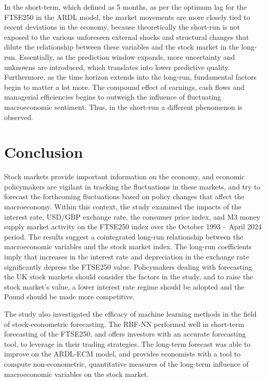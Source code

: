 \documentclass[11pt,a4paper]{article}
\begin{document}
In the short-term, which defined as 5 months, 
as per the optimum lag for the FTSE250 in the ARDL model, the market movements
are more closely tied to recent deviations in the economy, because theoretically
the short-run is not exposed to the various unforeseen external shocks and structural changes
that dilute the relationship between these variables and the stock market in the 
long-run. Essentially, as the prediction window expands, 
more uncertainty and unknowns are introduced, which translates into 
lower predictive quality. Furthermore, as the time horizon extends into the long-run, fundamental factors 
begin to matter a lot more. The compound effect of earnings, cash flows and
managerial efficiencies begins to outweigh the 
influence of fluctuating macroeconomic sentiment. Thus, in the short-run 
a different phenomenon is observed.





\section{Conclusion}

Stock markets provide important information on the economy, 
and economic policymakers are vigilant in tracking the fluctuations 
in these markets, and try to forecast the 
forthcoming fluctuations based on policy changes that affect the macroeconomy.
Within this context, the study examined the 
impacts of the interest rate, USD/GBP
exchange rate, the consumer price index, and 
M3 money supply market activity on
the FTSE250 index over the October 1993 – April 2024 period.
The results suggest a cointegrated long-run
relationship between the macroeconomic variables and the stock market index. 
The long-run coefficients imply that
increases in the interest rate and depreciation in the exchange rate
significantly depress the FTSE250 value. 
Policymakers dealing with forecasting the UK stock markets
should consider the factors in the study, and to raise the stock
market's value, a lower interest rate regime should be adopted and 
the Pound should be made more competitive.

The study also investigated the efficacy of machine learning methods in 
the field of stock-econometric forecasting. The RBF-NN performed well in
short-term forecasting of the FTSE250, and offers investors with an accurate forecasting tool, 
to leverage in their trading strategies. The long-term forecast was able to improve on the ARDL-ECM model, and provides 
economists with a tool to compute non-econometric, quantitative measures of the 
long-term influence of macroeconomic variables on the stock market. 
\end{document}
